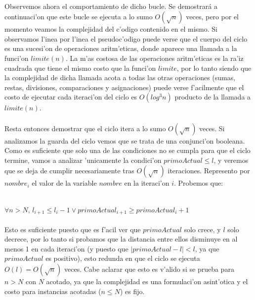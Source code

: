 \paragraph{}
Observemos ahora el comportamiento de dicho bucle. Se demostrará a continuaci'on que este bucle se ejecuta a lo sumo
$O(\sqrt{n})$ veces, pero por el momento veamos la complejidad del c'odigo contenido en el mismo. Si observamos
l'inea por l'inea el pseudoc'odigo puede verse que el cuerpo del ciclo es una sucesi'on de operaciones aritm'eticas,
donde aparece una llamada a la funci'on $limite(n)$. La m'as costosa de las operaciones aritm'eticas es la ra'iz
cuadrada que tiene el mismo costo que la funci'on $limite$, por lo tanto siendo que la complejidad de dicha llamada
acota a todas las otras operaciones (sumas, restas, divisiones, comparaciones y asignaciones) puede verse f'acilmente
que el costo de ejecutar cada iteraci'on del ciclo es $O(log^3 n)$ producto de la llamada a $limite(n)$.

\paragraph{}
Resta entonces demostrar que el ciclo itera a lo sumo $O(\sqrt{n})$ veces. Si analizamos la guarda del ciclo vemos
que se trata de una conjunci'on booleana. Como es suficiente que solo una de las condiciones no se cumpla para que
el ciclo termine, vamos a analizar 'unicamente la condici'on $primoActual \leq l$, y veremos que se deja de cumplir
necesariamente tras $O(\sqrt{n})$ iteraciones. Represento por $nombre_i$ el valor de la variable $nombre$ en la 
iteraci'on $i$. Probemos que:\\
\\
\centerline{$\forall n > N$, $l_{i+1} \leq l_i - 1 \vee primoActual_{i+1} \geq primoActual_i + 1$}

\paragraph{}
Esto es suficiente puesto que es f'acil ver que $primoActual$ solo crece, y $l$ solo decrece, por lo tanto si
probamos que la distancia entre ellos disminuye en al menos 1 en cada iteraci'on (y puesto que $|primoActual - l| < l$,
ya que $primoActual$ es positivo), esto redunda en que el ciclo se ejecuta $O(l)=O(\sqrt{n})$ veces. Cabe aclarar
que esto es v'alido si se prueba para $n > N$ con $N$ acotado, ya que la complejidad es una formulaci'on asint'otica
y el costo para instancias acotadas ($n \leq N$) es fijo.


